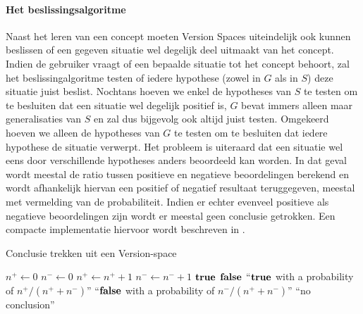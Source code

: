 \paragraph{Het beslissingsalgoritme}
Naast het leren van een concept moeten Version Spaces uiteindelijk ook kunnen beslissen of een gegeven situatie wel degelijk deel uitmaakt van het concept. Indien de gebruiker vraagt of een bepaalde situatie tot het concept behoort, zal het beslissingalgoritme testen of iedere hypothese (zowel in $G$ als in $S$) deze situatie juist beslist. Nochtans hoeven we enkel de hypotheses van $S$ te testen om te besluiten dat een situatie wel degelijk positief is, $G$ bevat immers alleen maar generalisaties van $S$ en zal dus bijgevolg ook altijd juist testen. Omgekeerd hoeven we alleen de hypotheses van $G$ te testen om te besluiten dat iedere hypothese de situatie verwerpt. Het probleem is uiteraard dat een situatie wel eens door verschillende hypotheses anders beoordeeld kan worden. In dat geval wordt meestal de ratio tussen positieve en negatieve beoordelingen berekend en wordt afhankelijk hiervan een positief of negatief resultaat teruggegeven, meestal met vermelding van de probabiliteit. Indien er echter evenveel positieve als negatieve beoordelingen zijn wordt er meestal geen conclusie getrokken. Een compacte implementatie hiervoor wordt beschreven in .
\begin{algorithm}[htb]
\caption{Conclusie trekken uit een Version-space}
\label{alg:versionSpacesConclusion}
\begin{algorithmic}[1]
\STATE$n^+\leftarrow0$
\STATE$n^-\leftarrow0$
\STATE$n^+\leftarrow n^++1$
\ELSE
\STATE$n^-\leftarrow n^-+1$
\ENDIF
\ENDFOR
{}
\RETURN $\mbox{\bf true}$
\RETURN $\mbox{\bf false}$
\RETURN ``$\mbox{\bf true}$ with a probability of $n^+/(n^++n^-)$''
\RETURN ``$\mbox{\bf false}$ with a probability of $n^-/(n^++n^-)$''
\ELSE[$n^+=n^-$]
\RETURN ``no conclusion''
\ENDIF
\end{algorithmic}
\end{algorithm}
